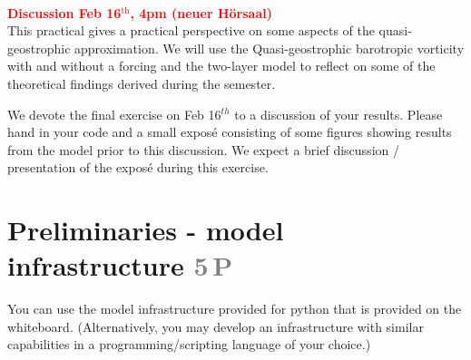 \documentclass[jobname=project, 10pt]{article}
\newcommand{\task}[2]{\section{#1 \hfill \normalsize\normalfont \textcolor{gray}{#2\,P}}\addtocounter{ptot}{#2}}
\newcounter{ptot}
\begin{document}
~\\[-3em]
\phantom{AA}\hfill \textcolor{red}{\textbf{Discussion Feb 16$^\mathrm{th}$, 4pm (neuer H\"orsaal)}} \\
This practical gives a practical perspective on some aspects of the quasi-geostrophic approximation.
We will use the Quasi-geostrophic barotropic vorticity with and without a forcing and the two-layer model
to reflect on some of the theoretical findings derived during the semester.
%
\par
% 
We devote the final exercise on Feb 16$^{th}$ to a discussion of your results. Please hand in your code and a small expos\'e consisting of some figures showing results from the model prior to this discussion. We expect a brief discussion / presentation of the expos\'e during this exercise. 

\task{Preliminaries - model infrastructure}{5}

You can use the model infrastructure provided for python that is provided on the whiteboard. (Alternatively, you may develop an infrastructure with similar capabilities in a programming/scripting language of your choice.) \\ 
\end{document}
